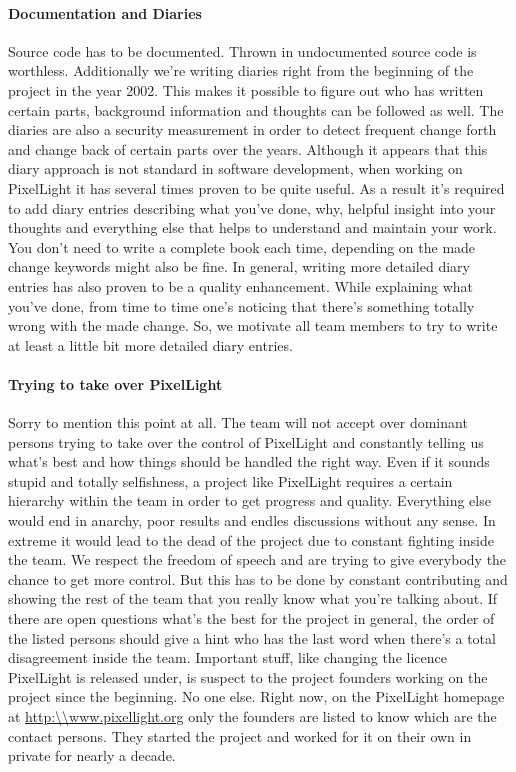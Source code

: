 \paragraph{Documentation and Diaries}
Source code has to be documented. Thrown in undocumented source code is worthless. Additionally we're writing diaries right from the beginning of the project in the year 2002. This makes it possible to figure out who has written certain parts, background information and thoughts can be followed as well. The diaries are also a security measurement in order to detect frequent change forth and change back of certain parts over the years. Although it appears that this diary approach is not standard in software development, when working on PixelLight it has several times proven to be quite useful. As a result it's required to add diary entries describing what you've done, why, helpful insight into your thoughts and everything else that helps to understand and maintain your work. You don't need to write a complete book each time, depending on the made change keywords might also be fine. In general, writing more detailed diary entries has also proven to be a quality enhancement. While explaining what you've done, from time to time one's noticing that there's something totally wrong with the made change. So, we motivate all team members to try to write at least a little bit more detailed diary entries.


\paragraph{Trying to take over PixelLight}
Sorry to mention this point at all. The team will not accept over dominant persons trying to take over the control of PixelLight and constantly telling us what's best and how things should be handled the right way. Even if it sounds stupid and totally selfishness, a project like PixelLight requires a certain hierarchy within the team in order to get progress and quality. Everything else would end in anarchy, poor results and endles discussions without any sense. In extreme it would lead to the dead of the project due to constant fighting inside the team. We respect the freedom of speech and are trying to give everybody the chance to get more control. But this has to be done by constant contributing and showing the rest of the team that you really know what you're talking about. If there are open questions what's the best for the project in general, the order of the listed persons should give a hint who has the last word when there's a total disagreement inside the team. Important stuff, like changing the licence PixelLight is released under, is suspect to the project founders working on the project since the beginning. No one else. Right now, on the PixelLight homepage at \url{http:\\www.pixellight.org} only the founders are listed to know which are the contact persons. They started the project and worked for it on their own in private for nearly a decade.




